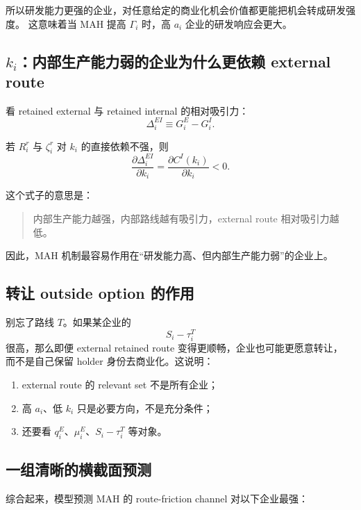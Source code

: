 \documentclass[12pt,UTF8]{ctexart}
\theoremstyle{plain}
\theoremstyle{remark}
\begin{document}
所以研发能力更强的企业，对任意给定的商业化机会价值都更能把机会转成研发强度。
这意味着当 MAH 提高 $\Gamma_i$ 时，高 $a_i$ 企业的研发响应会更大。

\subsection{\texorpdfstring{$k_i$}{内部生产能力}：内部生产能力弱的企业为什么更依赖 external route}

看 retained external 与 retained internal 的相对吸引力：
\begin{equation}
\Delta_i^{EI}
\equiv
G_i^E-G_i^I.
\label{eq:delta_EI}
\end{equation}

若 $R_i^r$ 与 $\zeta_i^r$ 对 $k_i$ 的直接依赖不强，则
\begin{equation}
\frac{\partial \Delta_i^{EI}}{\partial k_i}
=
\frac{\partial C^I(k_i)}{\partial k_i}
<0.
\label{eq:delta_k}
\end{equation}

这个式子的意思是：

\begin{quote}
内部生产能力越强，内部路线越有吸引力，external route 相对吸引力越低。
\end{quote}

因此，MAH 机制最容易作用在“研发能力高、但内部生产能力弱”的企业上。

\subsection{转让 outside option 的作用}

别忘了路线 $T$。如果某企业的
\[
S_i-\tau_i^T
\]
很高，那么即便 external retained route 变得更顺畅，企业也可能更愿意转让，
而不是自己保留 holder 身份去商业化。这说明：

\begin{enumerate}[leftmargin=2em]
    \item external route 的 relevant set 不是所有企业；
    \item 高 $a_i$、低 $k_i$ 只是必要方向，不是充分条件；
    \item 还要看 $q_i^E$、$\mu_i^E$、$S_i-\tau_i^T$ 等对象。
\end{enumerate}

\subsection{一组清晰的横截面预测}

综合起来，模型预测 MAH 的 route-friction channel 对以下企业最强：
\end{document}
